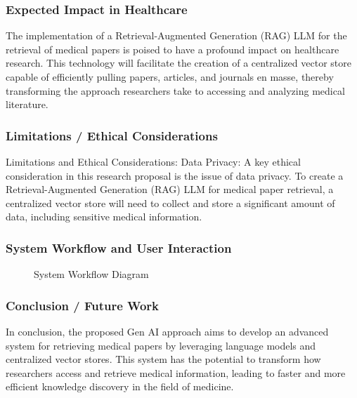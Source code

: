 \documentclass{beamer}
\begin{document}
\begin{frame}
\frametitle{Expected Impact in Healthcare}
The implementation of a Retrieval-Augmented Generation (RAG) LLM for the retrieval of medical papers is poised to have a profound impact on healthcare research. This technology will facilitate the creation of a centralized vector store capable of efficiently pulling papers, articles, and journals en masse, thereby transforming the approach researchers take to accessing and analyzing medical literature.
\end{frame}

\begin{frame}
\frametitle{Limitations / Ethical Considerations}
Limitations and Ethical Considerations:
Data Privacy: A key ethical consideration in this research proposal is the issue of data privacy. To create a Retrieval-Augmented Generation (RAG) LLM for medical paper retrieval, a centralized vector store will need to collect and store a significant amount of data, including sensitive medical information.
\end{frame}

\begin{frame}
\frametitle{System Workflow and User Interaction}
\begin{figure}
\caption{System Workflow Diagram}
\end{figure}
\end{frame}

\begin{frame}
\frametitle{Conclusion / Future Work}
In conclusion, the proposed Gen AI approach aims to develop an advanced system for retrieving medical papers by leveraging language models and centralized vector stores. This system has the potential to transform how researchers access and retrieve medical information, leading to faster and more efficient knowledge discovery in the field of medicine.
\end{frame}
\end{document}
